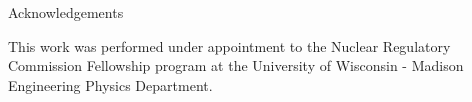 \documentclass{beamer}
\begin{document}
\begin{frame}{Acknowledgements}

This work was performed under appointment to the Nuclear Regulatory
Commission Fellowship program at the University of Wisconsin - Madison
Engineering Physics Department.

\end{frame}

\end{document}
